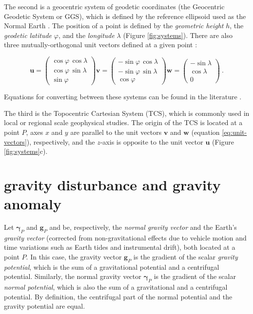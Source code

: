 \documentclass[manuscript]{geophysics}
\begin{document}
The second is a geocentric system of geodetic coordinates
(the Geocentric Geodetic System or GGS),
which is defined by the reference ellipsoid used as the Normal Earth
\citep{heiskanen-moritz1967, soler1976, torge2012, bouman_etal2013}.
The position of a point is defined by
the \textit{geometric height} $h$,
the \textit{geodetic latitude} $\varphi$,
and the \textit{longitude} $\lambda$ (Figure \ref{fig:systems}).
There are also three mutually-orthogonal unit vectors defined at a given point
\citep{soler1976}:

\begin{equation}
    \mathbf{u} =
    \begin{pmatrix}
        \cos\varphi \, \cos\lambda \\
        \cos\varphi \, \sin\lambda \\
        \sin\varphi
    \end{pmatrix}
    \mathbf{v} =
    \begin{pmatrix}
        -\sin\varphi \, \cos\lambda \\
        -\sin\varphi \, \sin\lambda \\
        \cos\varphi
    \end{pmatrix}
    \mathbf{w} =
    \begin{pmatrix}
        -\sin\lambda \\
        \cos\lambda \\
        0
    \end{pmatrix} \: .
    \label{eq:unit-vectors}
\end{equation}

\noindent Equations for converting between these systems can be found in
the literature \citep[e.g.,][]{heiskanen-moritz1967, torge2012,
bouman_etal2013}.

The third is the Topocentric Cartesian System (TCS),
which is commonly used in local or regional scale geophysical studies.
The origin of the TCS is located at a point $P$,
axes $x$ and $y$ are parallel to
the unit vectors $\mathbf{v}$ and $\mathbf{w}$
(equation \ref{eq:unit-vectors}), respectively,
and the $z$-axis is opposite to the unit vector $\mathbf{u}$
(Figure \ref{fig:systems}c).


\section{gravity disturbance and gravity anomaly}

Let $\boldsymbol{\gamma}_{P}$ and $\mathbf{g}_{P}$ and be, respectively,
the \textit{normal gravity vector} and the Earth's \textit{gravity vector}
(corrected from non-gravitational effects due to vehicle
motion and time variations such as Earth tides and instrumental drift),
both located at a point $P$.
In this case, the gravity vector $\mathbf{g}_{P}$ is the
gradient of the scalar \textit{gravity potential},
which is the sum of a gravitational potential and a centrifugal potential.
Similarly, the normal gravity vector $\boldsymbol{\gamma}_{P}$ is the
gradient of the scalar \textit{normal potential},
which is also the sum of a gravitational and a centrifugal potential.
By definition, the centrifugal part of
the normal potential and the gravity potential are equal.
\end{document}
